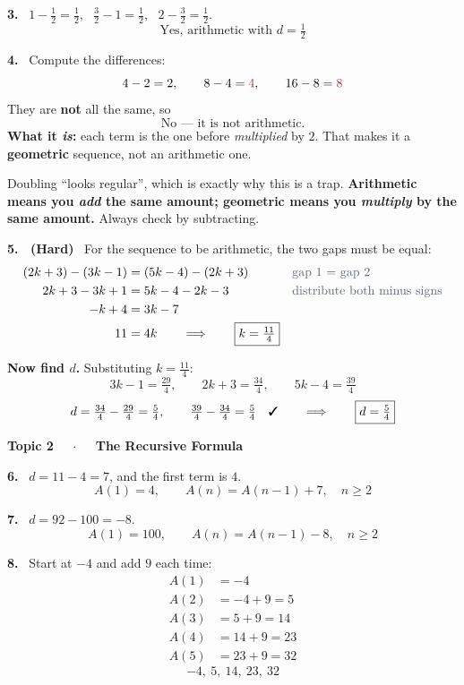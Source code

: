 \documentclass[11pt]{article}
\newcommand{\ans}[1]{\boxed{#1}}
\newcommand{\vans}[1]{\textbf{\textcolor{ink}{#1}}}
\newcommand{\rsn}[1]{\textcolor{slate}{\text{#1}}}
\newcommand{\mneg}[1]{\textcolor{crim}{#1}}
\newcommand{\keyhead}[1]{%
  \par\vspace{9pt}\noindent
  \begin{tcolorbox}[colback=violet!12,colframe=violet,arc=2pt,boxrule=0pt,
    leftrule=3.2pt,left=8pt,right=8pt,top=3pt,bottom=3pt]
  {\color{violet}\bfseries #1}
  \end{tcolorbox}\par\vspace{2pt}}
\begin{document}
\vspace{3pt}
\textbf{3.} \ $1-\tfrac12=\tfrac12$, \ $\tfrac32-1=\tfrac12$, \ $2-\tfrac32=\tfrac12$.
\[
\ans{\text{Yes, arithmetic with } d=\tfrac12}
\]

\vspace{4pt}
\textbf{4.} \ Compute the differences:
\[
4-2=2, \qquad 8-4=\mneg{4}, \qquad 16-8=\mneg{8}
\]
They are \textbf{not} all the same, so
\[
\ans{\text{No --- it is not arithmetic.}}
\]
\vans{What it \emph{is}:} each term is the one before \emph{multiplied} by $2$. That makes it a
\textbf{geometric} sequence, not an arithmetic one.

\begin{warnbox}
Doubling ``looks regular'', which is exactly why this is a trap. \textbf{Arithmetic means you
\emph{add} the same amount; geometric means you \emph{multiply} by the same amount.} Always check
by subtracting.
\end{warnbox}

\vspace{4pt}
\textbf{5. \ (Hard)} \ For the sequence to be arithmetic, the two gaps must be equal:
\begin{align*}
(2k+3)-(3k-1) &= (5k-4)-(2k+3) && \rsn{gap 1 $=$ gap 2}\\
2k+3-3k+1 &= 5k-4-2k-3 && \rsn{distribute both minus signs}\\
-k+4 &= 3k-7\\
11 &= 4k \qquad\Longrightarrow\qquad \ans{k=\tfrac{11}{4}}
\end{align*}

\textbf{Now find $d$.} Substituting $k=\tfrac{11}{4}$:
\[
3k-1=\tfrac{29}{4}, \qquad 2k+3=\tfrac{34}{4}, \qquad 5k-4=\tfrac{39}{4}
\]
\[
d=\tfrac{34}{4}-\tfrac{29}{4}=\tfrac54, \qquad
\tfrac{39}{4}-\tfrac{34}{4}=\tfrac54 \quad\text{\ding{51}}
\qquad\Longrightarrow\qquad \ans{d=\tfrac54}
\]

\keyhead{Topic 2 \ \ $\cdot$ \ \ The Recursive Formula}

\textbf{6.} \ $d=11-4=7$, and the first term is $4$.
\[
\ans{A(1)=4, \qquad A(n)=A(n-1)+7, \quad n\ge2}
\]

\vspace{3pt}
\textbf{7.} \ $d=92-100=-8$.
\[
\ans{A(1)=100, \qquad A(n)=A(n-1)-8, \quad n\ge2}
\]

\vspace{3pt}
\textbf{8.} \ Start at $-4$ and add $9$ each time:
\begin{align*}
A(1)&=-4\\
A(2)&=-4+9=5\\
A(3)&=5+9=14\\
A(4)&=14+9=23\\
A(5)&=23+9=32
\end{align*}
\[
\ans{-4,\ 5,\ 14,\ 23,\ 32}
\]
\end{document}
